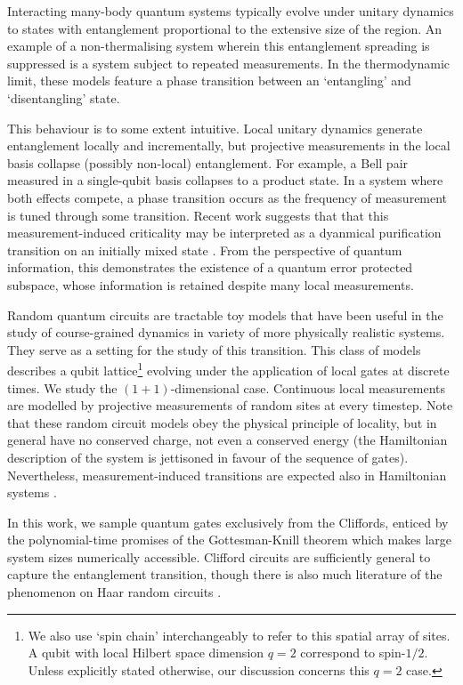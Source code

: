 \documentclass[10pt]{article}
\begin{document}
Interacting many-body quantum systems typically evolve under unitary dynamics to states with entanglement proportional to the extensive size of the region. An example of a non-thermalising system wherein this entanglement spreading is suppressed is a system subject to repeated measurements. In the thermodynamic limit, these models feature a phase transition between an `entangling' and `disentangling' state.

This behaviour is to some extent intuitive. Local unitary dynamics generate entanglement locally and incrementally, but projective measurements in the local basis collapse (possibly non-local) entanglement. For example, a Bell pair measured in a single-qubit basis collapses to a product state. In a system where both effects compete, a phase transition occurs as the frequency of measurement is tuned through some transition. Recent work suggests that that this measurement-induced criticality may be interpreted as a dyanmical purification transition on an initially mixed state \cite{gullans2019dynamical}. From the perspective of quantum information, this demonstrates the existence of a quantum error protected subspace, whose information is retained despite many local measurements.

Random quantum circuits are tractable toy models that have been useful in the study of course-grained dynamics in variety of more physically realistic systems. They serve as a setting for the study of this transition. This class of models describes a qubit lattice\footnote{We also use `spin chain' interchangeably to refer to this spatial array of sites. A qubit with local Hilbert space dimension $q=2$ correspond to spin-$1/2$. Unless explicitly stated otherwise, our discussion concerns this $q=2$ case.} evolving under the application of local gates at discrete times. We study the $(1+1)$-dimensional case. Continuous local measurements are modelled by projective measurements of random sites at every timestep. Note that these random circuit models obey the physical principle of locality, but in general have no conserved charge, not even a conserved energy (the Hamiltonian description of the system is jettisoned in favour of the sequence of gates). Nevertheless, measurement-induced transitions are expected also in Hamiltonian systems \cite{tang2020measurement}. 

In this work, we sample quantum gates exclusively from the Cliffords, enticed by the polynomial-time promises of the Gottesman-Knill theorem which makes large system sizes numerically accessible. Clifford circuits are sufficiently general to capture the entanglement transition, though there is also much literature of the phenomenon on Haar random circuits \cite{skinner2019measurement, zabalo2020critical, bao2020theory}. 
\end{document}
